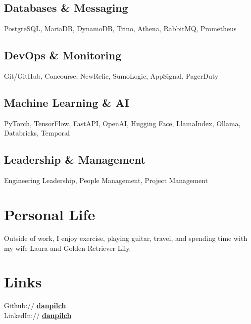 \documentclass[]{resume}
\begin{document}
\begin{minipage}[t]{0.33\textwidth}
\subsection{Databases \& Messaging}
PostgreSQL, MariaDB, DynamoDB, Trino, Athena, RabbitMQ, Prometheus
\sectionsep

\subsection{DevOps \& Monitoring}
Git/GitHub, Concourse, NewRelic, SumoLogic, AppSignal, PagerDuty
\sectionsep

\subsection{Machine Learning \& AI}
PyTorch, TensorFlow, FastAPI, OpenAI, Hugging Face, LlamaIndex, Ollama, Databricks, Temporal
\sectionsep

\subsection{Leadership \& Management}
Engineering Leadership, People Management, Project Management


\section{Personal Life}
Outside of work, I enjoy exercise, playing guitar, travel, and spending time with my wife Laura and Golden Retriever Lily.
\sectionsep


\section{Links}
Github:// \href{https://github.com/danpilch}{\bf danpilch} \\
LinkedIn://  \href{https://www.linkedin.com/in/danpilch}{\bf danpilch}
\sectionsep

\end{minipage}
\end{document}
